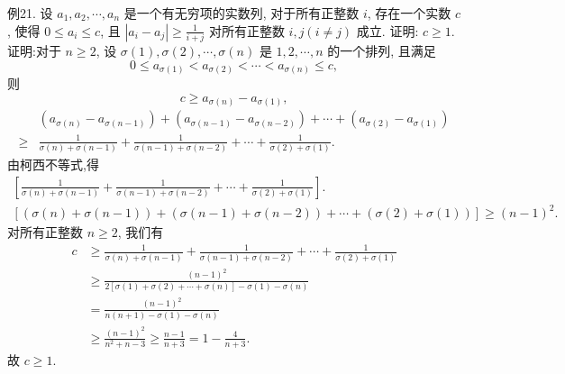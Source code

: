 例21. 设 $a_1, a_2, \cdots, a_n$ 是一个有无穷项的实数列, 对于所有正整数 $i$, 存在一个实数 $c$, 使得 $0 \leqslant a_i \leqslant c$, 且 $\left|a_i-a_j\right| \geqslant \frac{1}{i+j}$ 对所有正整数 $i, j (i \neq j)$ 成立.
证明: $c \geqslant 1$.
证明:对于 $n \geqslant 2$, 设 $\sigma(1), \sigma(2), \cdots, \sigma(n)$ 是 $1,2, \cdots, n$ 的一个排列, 且满足
$$
0 \leqslant a_{\sigma(1)}<a_{\sigma(2)}<\cdots<a_{\sigma(n)} \leqslant c,
$$
则
$$
c \geqslant a_{\sigma(n)}-a_{\sigma(1)},
$$
$$
\begin{aligned}
& \left(a_{\sigma(n)}-a_{\sigma(n-1)}\right)+\left(a_{\sigma(n-1)}-a_{\sigma(n-2)}\right)+\cdots+\left(a_{\sigma(2)}-a_{\sigma(1)}\right) \\
\geqslant & \frac{1}{\sigma(n)+\sigma(n-1)}+\frac{1}{\sigma(n-1)+\sigma(n-2)}+\cdots+\frac{1}{\sigma(2)+\sigma(1)} .
\end{aligned}
$$
由柯西不等式,得
$$
\begin{gathered}
{\left[\frac{1}{\sigma(n)+\sigma(n-1)}+\frac{1}{\sigma(n-1)+\sigma(n-2)}+\cdots+\frac{1}{\sigma(2)+\sigma(1)}\right] .} \\
{[(\sigma(n)+\sigma(n-1))+(\sigma(n-1)+\sigma(n-2))+\cdots+(\sigma(2)+\sigma(1))] \geqslant(n-1)^2 .}
\end{gathered}
$$
对所有正整数 $n \geqslant 2$, 我们有
$$
\begin{aligned}
c & \geqslant \frac{1}{\sigma(n)+\sigma(n-1)}+\frac{1}{\sigma(n-1)+\sigma(n-2)}+\cdots+\frac{1}{\sigma(2)+\sigma(1)} \\
& \geqslant \frac{(n-1)^2}{2[\sigma(1)+\sigma(2)+\cdots+\sigma(n)]-\sigma(1)-\sigma(n)} \\
& =\frac{(n-1)^2}{n(n+1)-\sigma(1)-\sigma(n)} \\
& \geqslant \frac{(n-1)^2}{n^2+n-3} \geqslant \frac{n-1}{n+3}=1-\frac{4}{n+3} .
\end{aligned}
$$
故 $c \geqslant 1$.




